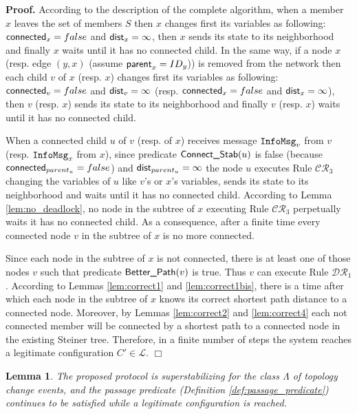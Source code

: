 \documentclass[11pt]{article}
\newtheorem{lemma}{Lemma}
\newenvironment{proof}{\noindent \begin{rm}{\textbf{Proof.} }}{\hspace*{\fill}$\Box$\par\end{rm} \vspace{.3cm}}
\newcommand{\InfoMsg}{\mbox{\tt InfoMsg}}
\newcommand{\parent}{\mbox{\sf parent}}
\newcommand{\dist}{\mbox{\sf dist}}
\newcommand{\connect}{\mbox{\sf connected}}
\newcommand{\Better}{\mbox{\sf Better\_Path}}
\newcommand{\ConnectS}{\mbox{\sf Connect\_Stab}}
\newcommand{\ARA}{$\mathcal{DR}_1$}
\newcommand{\CRG}{$\mathcal{CR}_3$}
\begin{document}
\begin{proof}
According to the description of the complete algorithm, when a member $x$ leaves the set of members $S$ then $x$ changes first its variables as following: $\connect_x=false$ and $\dist_x=\infty$, then $x$ sends its state to its neighborhood and finally $x$ waits until it has no connected child. In the same way, if a node $x$ (resp. edge $(y,x)$ (assume $\parent_x=ID_y$)) is removed from the network then each child $v$ of $x$ (resp. $x$) changes first its variables as following: $\connect_v=false$ and $\dist_v=\infty$ (resp. $\connect_x=false$ and $\dist_x=\infty$), then $v$ (resp. $x$) sends its state to its neighborhood and finally $v$ (resp. $x$) waits until it has no connected child.

When a connected child $u$ of $v$ (resp. of $x$) receives message $\InfoMsg_v$ from $v$ (resp. $\InfoMsg_x$ from $x$), since predicate $\ConnectS(u)$ is false (because $\connect_{parent_u}=false$) and $\dist_{parent_u}=\infty$ the node $u$ executes Rule \CRG\/ changing the variables of $u$ like $v$'s or $x$'s variables, sends its state to its neighborhood and waits until it has no connected child. According to Lemma \ref{lem:no_deadlock}, no node in the subtree of $x$ executing Rule \CRG\/ perpetually waits it has no connected child. As a consequence, after a finite time every connected node $v$ in the subtree of $x$ is no more connected.

Since each node in the subtree of $x$ is not connected, there is at least one of those nodes $v$ such that predicate $\Better(v)$ is true. Thus $v$ can execute Rule \ARA\/. According to Lemmas \ref{lem:correct1} and \ref{lem:correct1bis}, there is a time after which each node in the subtree of $x$ knows its correct shortest path distance to a connected node. Moreover, by Lemmas \ref{lem:correct2} and \ref{lem:correct4} each not connected member will be connected by a shortest path to a connected node in the existing Steiner tree. Therefore, in a finite number of steps the system reaches a legitimate configuration $C' \in \mathcal{L}$.
\end{proof}

\begin{lemma}
\label{lem:2}
The proposed protocol is superstabilizing for the class $\Lambda$ of
topology change events, and the passage predicate (Definition
\ref{def:passage_predicate}) continues to be satisfied while a
legitimate configuration is reached.
\end{lemma}
\end{document}
